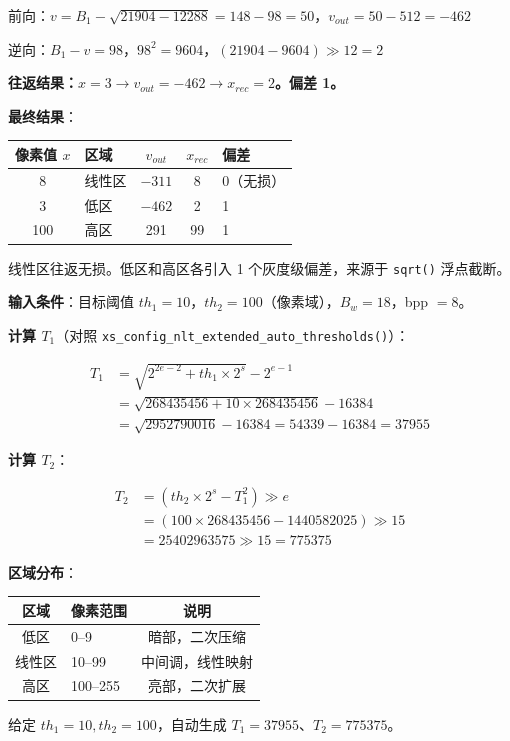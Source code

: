\begin{examplebox}[title={例 3：NLT Extended（扩展三段式变换）}]
前向：$v = B_1 - \sqrt{21904 - 12288} = 148 - 98 = 50$，$v_{\mathit{out}} = 50 - 512 = -462$

逆向：$B_1 - v = 98$，$98^2 = 9604$，$(21904 - 9604) \gg 12 = 2$

\textbf{往返结果：$x = 3 \to v_{\mathit{out}} = -462 \to x_{\mathit{rec}} = 2$。偏差 1。}

\medskip
\textbf{最终结果}：

\begin{tabular}{@{}clccl@{}}
\toprule
像素值 $x$ & 区域 & $v_{\mathit{out}}$ & $x_{\mathit{rec}}$ & 偏差 \\
\midrule
8 & 线性区 & $-311$ & 8 & 0（无损） \\
3 & 低区 & $-462$ & 2 & 1 \\
100 & 高区 & 291 & 99 & 1 \\
\bottomrule
\end{tabular}

线性区往返无损。低区和高区各引入 1 个灰度级偏差，来源于 \texttt{sqrt()} 浮点截断。
\end{examplebox}

\begin{examplebox}[title={例 4：Extended NLT 自动阈值生成}]

\textbf{输入条件}：目标阈值 $\mathit{th}_1 = 10$，$\mathit{th}_2 = 100$（像素域），$B_w = 18$，bpp $= 8$。

\medskip
\textbf{计算 $T_1$}（对照 \texttt{xs\_config\_nlt\_extended\_auto\_thresholds()}）：

\begin{align*}
T_1 &= \sqrt{2^{2e-2} + \mathit{th}_1 \times 2^s} - 2^{e-1} \\
&= \sqrt{268435456 + 10 \times 268435456} - 16384 \\
&= \sqrt{2952790016} - 16384 = 54339 - 16384 = 37955
\end{align*}

\textbf{计算 $T_2$}：

\begin{align*}
T_2 &= (\mathit{th}_2 \times 2^s - T_1^2) \gg e \\
&= (100 \times 268435456 - 1440582025) \gg 15 \\
&= 25402963575 \gg 15 = 775375
\end{align*}

\textbf{区域分布}：

\begin{tabular}{@{}clc@{}}
\toprule
区域 & 像素范围 & 说明 \\
\midrule
低区 & 0--9 & 暗部，二次压缩 \\
线性区 & 10--99 & 中间调，线性映射 \\
高区 & 100--255 & 亮部，二次扩展 \\
\bottomrule
\end{tabular}

给定 $\mathit{th}_1 = 10, \mathit{th}_2 = 100$，自动生成 $T_1 = 37955$、$T_2 = 775375$。
\end{examplebox}
